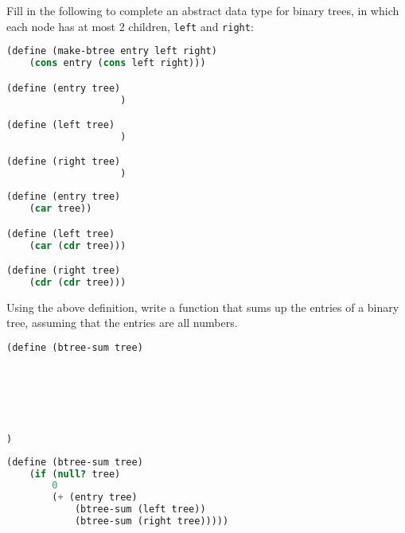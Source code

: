 \question Fill in the following to complete an abstract data type for binary
trees, in which each node has at most 2 children, {\tt left} and {\tt right}:

\begin{lstlisting}[language=Scheme]
(define (make-btree entry left right)
    (cons entry (cons left right)))

(define (entry tree)
                    )

(define (left tree)
                    )

(define (right tree)
                    )

\end{lstlisting}

\begin{solution}
\begin{lstlisting}[language=Scheme]
(define (entry tree)
    (car tree))

(define (left tree)
    (car (cdr tree)))

(define (right tree)
    (cdr (cdr tree)))
\end{lstlisting}
\end{solution}
\question Using the above definition, write a function that sums up the entries of a binary tree, assuming that the entries are all numbers.

\begin{lstlisting}[language=Scheme]
(define (btree-sum tree)






)
\end{lstlisting}

\begin{solution}
\begin{lstlisting}[language=Scheme]
(define (btree-sum tree)
    (if (null? tree)
        0
        (+ (entry tree)
            (btree-sum (left tree))
            (btree-sum (right tree)))))
\end{lstlisting}
\end{solution}
